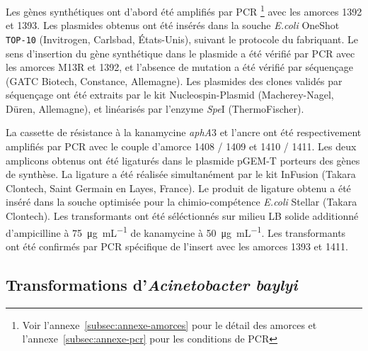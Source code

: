 Les gènes synthétiques ont d'abord été amplifiés par PCR \footnote{Voir
  l'annexe~\ref{subsec:annexe-amorces} pour le détail des amorces et
  l'annexe~\ref{subsec:annexe-pcr} pour les conditions de PCR} avec les amorces
1392 et 1393. Les plasmides obtenus ont été insérés dans la souche \emph{E.coli}
OneShot\textsuperscript{{\textregistered}} \texttt{TOP-10} (Invitrogen,
Carlsbad, États-Unis), suivant le protocole du fabriquant. Le sens d'insertion
du gène synthétique dans le plasmide a été vérifié par PCR avec les amorces M13R
et 1392, et l'absence de mutation a été vérifié par séquençage (GATC Biotech,
Constance, Allemagne). Les plasmides des clones validés par séquençage ont été
extraits par le kit Nucleospin-Plasmid (Macherey-Nagel, Düren, Allemagne), et
linéarisés par l'enzyme \emph{Spe}I (ThermoFischer).

La cassette de résistance à la kanamycine \emph{aphA}3 et l'ancre ont été
respectivement amplifiés par PCR avec le couple d'amorce 1408 / 1409 et 1410 /
1411. Les deux amplicons obtenus ont été ligaturés dans le plasmide pGEM-T
porteurs des gènes de synthèse. La ligature a été réalisée simultanément par le
kit InFusion (Takara Clontech, Saint Germain en Layes, France). Le produit de
ligature obtenu a été inséré dans la souche optimisée pour la chimio-compétence
\emph{E.coli} Stellar (Takara Clontech). Les transformants ont été séléctionnés
sur milieu LB solide additionné d'ampicilline à \SI{75}{\ug\per\mL} de
kanamycine à \SI{50}{\ug\per\mL}. Les transformants ont été confirmés par PCR
spécifique de l'insert avec les amorces 1393 et 1411.

\subsection{Transformations d'\emph{Acinetobacter baylyi}}
\label{subsec:transfo}

